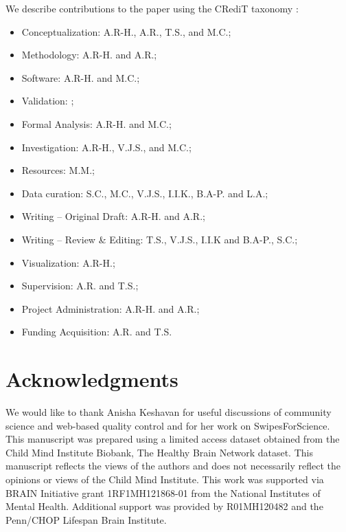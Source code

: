 \documentclass[9pt,lineno]{elife}
\begin{document}
We describe contributions to the paper using the CRediT taxonomy \citep{brand2015-vd,allen2014-oc}:
\begin{itemize}
    \item Conceptualization: A.R-H., A.R., T.S., and M.C.;
    \item Methodology: A.R-H. and A.R.;
    \item Software: A.R-H. and M.C.;
    \item Validation: ;
    \item Formal Analysis: A.R-H. and M.C.;
    \item Investigation: A.R-H., V.J.S., and M.C.;
    \item Resources: M.M.;
    \item Data curation: S.C., M.C., V.J.S., I.I.K., B.A-P. and L.A.;
    \item Writing – Original Draft: A.R-H. and A.R.;
    \item Writing – Review \& Editing: T.S., V.J.S., I.I.K and B.A-P., S.C.;
    \item Visualization: A.R-H.;
    \item Supervision: A.R. and T.S.;
    \item Project Administration: A.R-H. and A.R.;
    \item Funding Acquisition: A.R. and T.S.
\end{itemize}

\section{Acknowledgments}

We would like to thank Anisha Keshavan for useful discussions of community
science and web-based quality control and for her work on SwipesForScience. This
manuscript was prepared using a limited access dataset obtained from the Child
Mind Institute Biobank, The Healthy Brain Network dataset. This manuscript
reflects the views of the authors and does not necessarily reflect the opinions
or views of the Child Mind Institute. This work was supported via BRAIN Initiative grant 1RF1MH121868-01 from the National Institutes of Mental Health. Additional support was provided by R01MH120482 and the Penn/CHOP Lifespan Brain Institute. 



\end{document}
